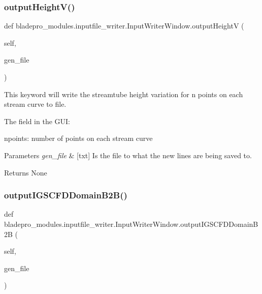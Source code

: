 \subsubsection{\texorpdfstring{output\+Height\+V()}{outputHeightV()}}
{\footnotesize\ttfamily def bladepro\+\_\+modules.\+inputfile\+\_\+writer.\+Input\+Writer\+Window.\+output\+HeightV (\begin{DoxyParamCaption}\item[{}]{self,  }\item[{}]{gen\+\_\+file }\end{DoxyParamCaption})}



This keyword will write the streamtube height variation for n points on each stream curve to file. 

The field in the G\+UI\+: \begin{DoxyItemize}
\item {\ttfamily npoints\+:} number of points on each stream curve\end{DoxyItemize}

\begin{DoxyParams}{Parameters}
{\em gen\+\_\+file} & \mbox{[}txt\mbox{]} Is the file to what the new lines are being saved to. \\
\hline
\end{DoxyParams}
\begin{DoxyReturn}{Returns}
None 
\end{DoxyReturn}
\hypertarget{a00070_a8e556016279f9aabdabb9b6f708c95cb}{}\label{a00070_a8e556016279f9aabdabb9b6f708c95cb} 
\subsubsection{\texorpdfstring{output\+I\+G\+S\+C\+F\+D\+Domain\+B2\+B()}{outputIGSCFDDomainB2B()}}
{\footnotesize\ttfamily def bladepro\+\_\+modules.\+inputfile\+\_\+writer.\+Input\+Writer\+Window.\+output\+I\+G\+S\+C\+F\+D\+Domain\+B2B (\begin{DoxyParamCaption}\item[{}]{self,  }\item[{}]{gen\+\_\+file }\end{DoxyParamCaption})}



